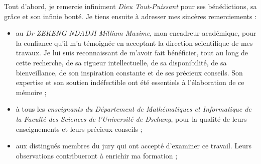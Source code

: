 
Tout d'abord, je remercie infiniment \textit{Dieu Tout-Puissant} pour ses bénédictions, sa grâce et son infinie bonté.
Je tiens ensuite à adresser mes sincères remerciements :
\begin{itemize}
    \item au \textit{Dr ZEKENG NDADJI Milliam Maxime}, mon encadreur académique, pour la confiance qu'il m'a témoignée en acceptant la direction scientifique de mes travaux. Je lui suis reconnaissant de m'avoir fait bénéficier, tout au long de cette recherche, de sa rigueur intellectuelle, de sa disponibilité, de sa bienveillance, de son inspiration constante et de ses précieux conseils. Son expertise et son soutien indéfectible ont été essentiels à l'élaboration de ce mémoire ;
    \item à tous les \textit{enseignants du Département de Mathématiques et Informatique de la Faculté des Sciences de l'Université de Dschang}, pour la qualité de leurs enseignements et leurs précieux conseils ;
    \item aux distingués membres du jury qui ont accepté d'examiner ce travail. Leurs observations contribueront à enrichir ma formation ;

\end{itemize}
